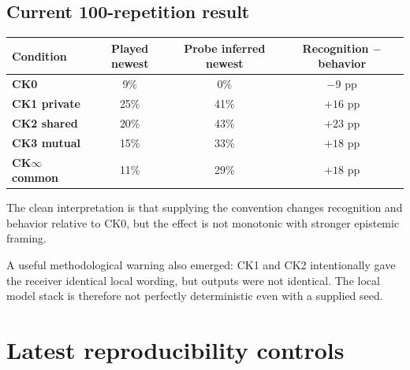 \documentclass[11pt,a4paper]{article}
\begin{document}
\subsection{Current 100-repetition result}

\begin{figure}[H]
\centering
{}
\end{figure}

\begin{table}[H]
\centering
\small
\begin{tabularx}{\textwidth}{>{\bfseries}p{28mm}CCC}
\toprule
Condition & Played newest & Probe inferred newest & Recognition $-$ behavior \\
\midrule
CK0 & 9\% & 0\% & $-9$ pp \\
CK1 private & 25\% & 41\% & $+16$ pp \\
CK2 shared & 20\% & 43\% & $+23$ pp \\
CK3 mutual & 15\% & 33\% & $+18$ pp \\
CK$\infty$ common & 11\% & 29\% & $+18$ pp \\
\bottomrule
\end{tabularx}
\end{table}

The clean interpretation is that supplying the convention changes recognition and behavior relative to CK0, but the effect is not monotonic with stronger epistemic framing.

A useful methodological warning also emerged: CK1 and CK2 intentionally gave the receiver identical local wording, but outputs were not identical. The local model stack is therefore not perfectly deterministic even with a supplied seed.

\section{Latest reproducibility controls}
\end{document}
